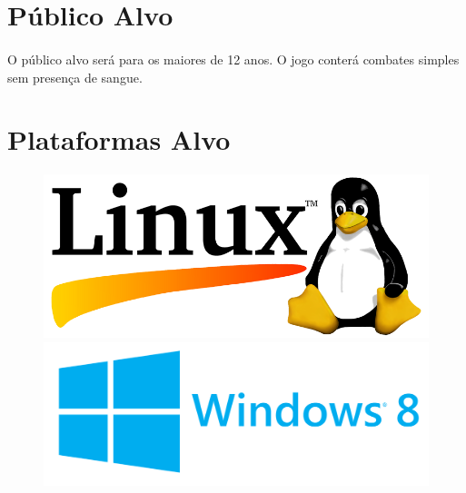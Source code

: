 \documentclass[11pt]{article} %
\begin{document}
\section*{Público Alvo}

\paragraph{}O público alvo será para os maiores de 12 anos. O jogo conterá combates simples sem presença de sangue.

\section*{Plataformas Alvo}

\begin{figure}[!htp]
\begin{center}
\includegraphics[scale=0.19]{res/linux.png} \quad
\includegraphics[scale=0.07]{res/windows.png} \quad
\end{center}
\end{figure}
\end{document}
